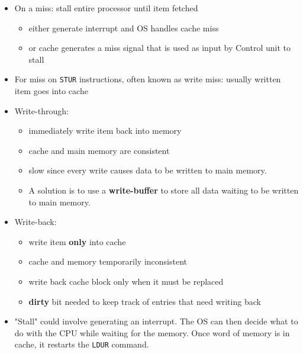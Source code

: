 

\begin{frame}[fragile]
\begin{itemize}
\item On a miss: stall entire processor until item fetched
\begin{itemize}
    \item either generate interrupt and OS handles cache miss
    \item or cache generates a miss signal that is used as input by Control unit to stall
\end{itemize}
\item For miss on \texttt{STUR} instructions, often known as write miss: usually written item goes into cache
\item Write-through: 
\begin{itemize}
    \item immediately write item back into memory
    \item cache and main memory are consistent
    \item slow since every write causes data to be written to main memory. \item {\footnotesize A solution is to use a \textbf{write-buffer} to store all data  waiting to be written to main memory.}
\end{itemize}
\item Write-back:
\begin{itemize}
    \item write item \textbf{only} into cache
    \item cache and memory temporarily inconsistent
\item write back cache block only when it must be replaced
\item \textbf{dirty} bit needed to keep track of entries that need writing back
\end{itemize}
\end{itemize}
\BNotes\ifnum{}
\begin{itemize}
\item "Stall" could involve generating an interrupt.  The OS can then decide
	what to do with the CPU while waiting for the memory.  Once word of
	memory is in cache, it restarts the \texttt{LDUR} command.


\end{itemize}
\end{frame}
